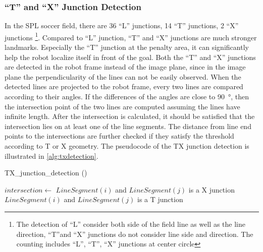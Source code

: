 \subsubsection{``T'' and ``X'' Junction Detection}
In the \gls{SPL} soccer field, there are 36 ``L'' junctions, 14 ``T'' junctions, 2 ``X'' junctions \footnote{The detection of ``L'' consider both side of the field line as well as the line direction, ``T''and ``X'' junctions do not consider line side and direction. The counting includes ``L'', ``T'', ``X'' junctions at center circle}. Compared to ``L'' junction, ``T'' and ``X'' junctions are much stronger landmarks. Especially the ``T'' junction at the penalty area, it can significantly help the robot localize itself in front of the goal.
Both the ``T'' and ``X'' junctions are detected in the robot frame instead of the image plane, since in the image plane the perpendicularity of the lines can not be easily observed. When the detected lines are projected to the robot frame, every two lines are compared according to their angles. If the differences of the angles are close to \SI{90}{\degree}, then the intersection point of the two lines are computed assuming the lines have infinite length. After the intersection is calculated, it should be satisfied that the intersection lies on at least one of the line segments. The distance from line end points to the intersections are further checked if they satisfy the threshold according to T or X geometry. The pseudocode of the TX junction detection is illustrated in \autoref{alg:txdetection}.

\begin{algorithm}                      
  \caption{TX\_junction\_detection ()}         %
\label{alg:txdetection}                           
\begin{algorithmic}[1]                    
		\State $intersection \gets$ 
				\State $LineSegment(i)$ and $LineSegment(j)$ is a X junction
			\EndIf
				\State $LineSegment(i)$ and $LineSegment(j)$ is a T junction
			\EndIf
		    \EndIf
		\EndIf
	\EndFor
  \EndFor
\end{algorithmic}
\end{algorithm}

